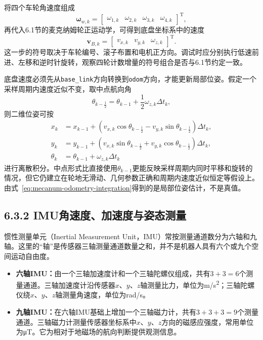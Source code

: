 \documentclass[UTF8,zihao=-4]{ctexart}
\newcommand{\vect}[1]{\bm{#1}}
\begin{document}
将四个车轮角速度组成
\begin{equation}
  \vect{\omega}_{w,k}=
  \begin{bmatrix}
    \omega_{1,k} & \omega_{2,k} & \omega_{3,k} & \omega_{4,k}
  \end{bmatrix}^{\mathrm T},
\end{equation}
再代入6.1节的麦克纳姆轮正运动学，可得到底盘坐标系中的速度
\begin{equation}
  \vect{v}_{B,k}=
  \begin{bmatrix}
    v_{x,k} & v_{y,k} & \omega_{z,k}
  \end{bmatrix}^{\mathrm T}.
  \label{eq:encoder-body-velocity}
\end{equation}
这一步的符号取决于车轮编号、滚子布置和电机正方向。调试时应分别执行低速前进、左移和逆时针旋转，观察四轮计数增量的符号组合是否与6.1节约定一致。

底盘速度必须先从\texttt{base\_link}方向转换到\texttt{odom}方向，才能更新局部位姿。假定一个采样周期内速度近似不变，取中点航向角
\begin{equation}
  \theta_{k-\frac{1}{2}}
  =\theta_{k-1}+\frac{1}{2}\omega_{z,k}\Delta t_k,
\end{equation}
则二维位姿可按
\begin{align}
  x_k &= x_{k-1}
  +\left(v_{x,k}\cos\theta_{k-\frac{1}{2}}
  -v_{y,k}\sin\theta_{k-\frac{1}{2}}\right)\Delta t_k,\\
  y_k &= y_{k-1}
  +\left(v_{x,k}\sin\theta_{k-\frac{1}{2}}
  +v_{y,k}\cos\theta_{k-\frac{1}{2}}\right)\Delta t_k,\\
  \theta_k &= \theta_{k-1}+\omega_{z,k}\Delta t_k
  \label{eq:mecanum-odometry-integration}
\end{align}
进行离散积分。中点形式比直接使用$\theta_{k-1}$更能反映采样周期内同时平移和旋转的情况，但它仍建立在轮地无滑动、几何参数正确和周期内速度近似恒定等假设上。由式~\eqref{eq:mecanum-odometry-integration}得到的是局部位姿估计，不是真值。

\subsection*{6.3.2 IMU角速度、加速度与姿态测量}

惯性测量单元（Inertial Measurement Unit，IMU）常按测量通道数分为六轴和九轴。这里的“轴”是传感器三轴测量通道数量之和，并不是机器人具有六个或九个空间运动自由度。

\begin{itemize}
  \item \textbf{六轴IMU：}由一个三轴加速度计和一个三轴陀螺仪组成，共有$3+3=6$个测量通道。三轴加速度计沿传感器$x$、$y$、$z$轴测量比力，单位为\si{m/s^2}；三轴陀螺仪绕$x$、$y$、$z$轴测量角速度，单位为\si{rad/s}。
  \item \textbf{九轴IMU：}在六轴IMU基础上增加一个三轴磁力计，共有$3+3+3=9$个测量通道。三轴磁力计测量传感器坐标系中$x$、$y$、$z$方向的磁感应强度，常用单位为\si{\micro\tesla}。它为相对于地磁场的航向判断提供观测信息。
\end{itemize}
\end{document}

